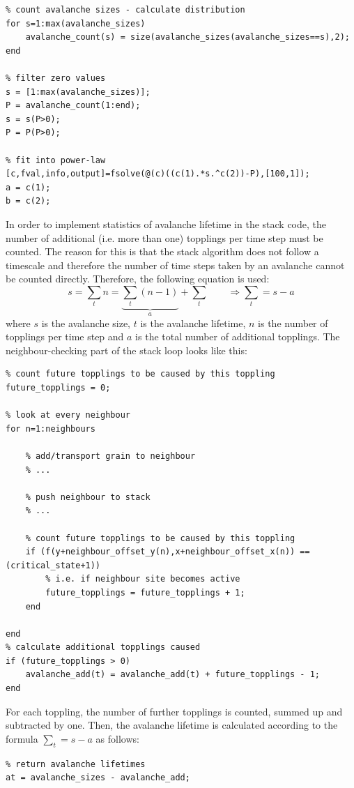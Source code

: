 \begin{lstlisting}
% count avalanche sizes - calculate distribution
for s=1:max(avalanche_sizes)
	avalanche_count(s) = size(avalanche_sizes(avalanche_sizes==s),2);
end

% filter zero values
s = [1:max(avalanche_sizes)];
P = avalanche_count(1:end);
s = s(P>0);
P = P(P>0);

% fit into power-law
[c,fval,info,output]=fsolve(@(c)((c(1).*s.^c(2))-P),[100,1]);
a = c(1);
b = c(2);

\end{lstlisting}

In order to implement statistics of avalanche lifetime in the stack code, the number of additional (i.e. more than one) topplings per time step must be counted. The reason for this is that the stack algorithm does not follow a timescale and therefore the number of time steps taken by an avalanche cannot be counted directly. Therefore, the following equation is used:
\[
s = \sum _t n = \underbrace{\sum_t (n - 1)}_{a} + \sum _t
\qquad \Rightarrow \sum _t = s - a
\]
where $s$ is the avalanche size, $t$ is the avalanche lifetime, $n$ is the number of topplings per time step and $a$ is the total number of additional topplings. The neighbour-checking part of the stack loop looks like this:
\begin{lstlisting}
% count future topplings to be caused by this toppling
future_topplings = 0;

% look at every neighbour
for n=1:neighbours

	% add/transport grain to neighbour
	% ...

	% push neighbour to stack
	% ...

	% count future topplings to be caused by this toppling
	if (f(y+neighbour_offset_y(n),x+neighbour_offset_x(n)) == (critical_state+1))
		% i.e. if neighbour site becomes active
		future_topplings = future_topplings + 1;
	end

end
% calculate additional topplings caused
if (future_topplings > 0)
	avalanche_add(t) = avalanche_add(t) + future_topplings - 1;
end
\end{lstlisting}
For each toppling, the number of further topplings is counted, summed up and subtracted by one. Then, the avalanche lifetime is calculated according to the formula $\sum _t = s - a$ as follows:
\begin{lstlisting}
% return avalanche lifetimes
at = avalanche_sizes - avalanche_add;
\end{lstlisting}


